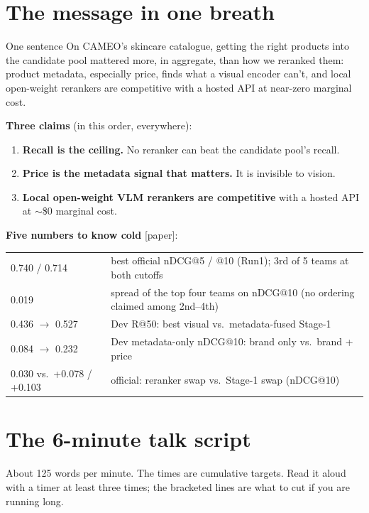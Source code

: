 \documentclass[11pt]{article}
\newcommand{\inpaper}{\textcolor{accent}{\small[paper]}}
\begin{document}
\section{The message in one breath}
\begin{say}{One sentence}
On CAMEO's skincare catalogue, getting the right products into the candidate pool mattered
more, in aggregate, than how we reranked them: product metadata, especially price, finds what
a visual encoder can't, and local open-weight rerankers are competitive with a hosted API at
near-zero marginal cost.
\end{say}

\textbf{Three claims} (in this order, everywhere):
\begin{enumerate}
  \item \textbf{Recall is the ceiling.} No reranker can beat the candidate pool's recall.
  \item \textbf{Price is the metadata signal that matters.} It is invisible to vision.
  \item \textbf{Local open-weight VLM rerankers are competitive} with a hosted API at
        $\sim$\$0 marginal cost.
\end{enumerate}

\textbf{Five numbers to know cold} \inpaper:
\begin{center}
\begin{tabularx}{\linewidth}{@{}lX@{}}
\toprule
0.740 / 0.714 & best official nDCG@5 / @10 (Run1); 3rd of 5 teams at both cutoffs \\
0.019 & spread of the top four teams on nDCG@10 (no ordering claimed among 2nd--4th) \\
0.436 $\to$ 0.527 & Dev R@50: best visual vs.\ metadata-fused Stage-1 \\
0.084 $\to$ 0.232 & Dev metadata-only nDCG@10: brand only vs.\ brand + price \\
0.030 vs.\ +0.078 / +0.103 & official: reranker swap vs.\ Stage-1 swap (nDCG@10) \\
\bottomrule
\end{tabularx}
\end{center}

\section{The 6-minute talk script}
About 125 words per minute. The times are cumulative targets. Read it aloud with a timer
at least three times; the bracketed lines are what to cut if you are running long.
\end{document}
